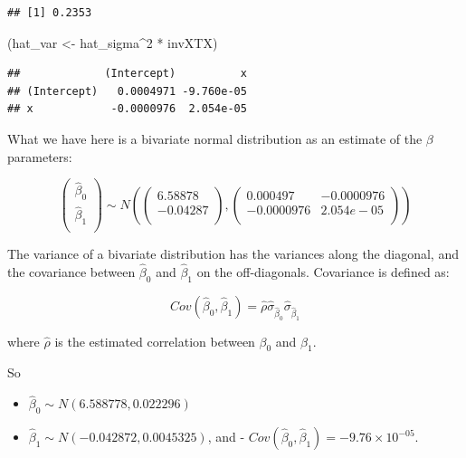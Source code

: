 \documentclass[
  12pt,
]{krantz}
\newenvironment{Shaded}{\begin{snugshade}}{\end{snugshade}}
\newcommand{\DecValTok}[1]{\textcolor[rgb]{0.00,0.00,0.81}{#1}}
\newcommand{\NormalTok}[1]{#1}
\newcommand{\OtherTok}[1]{\textcolor[rgb]{0.56,0.35,0.01}{#1}}
\newcommand{\SpecialCharTok}[1]{\textcolor[rgb]{0.00,0.00,0.00}{#1}}
\providecommand{\tightlist}{%
  \setlength{\itemsep}{0pt}\setlength{\parskip}{0pt}}
\theoremstyle{definition}
\theoremstyle{definition}
\theoremstyle{definition}
\theoremstyle{definition}
\theoremstyle{remark}
\begin{document}
\begin{verbatim}
## [1] 0.2353
\end{verbatim}

\begin{Shaded}
\begin{Highlighting}[]
\NormalTok{(hat\_var }\OtherTok{\textless{}{-}}\NormalTok{ hat\_sigma}\SpecialCharTok{\^{}}\DecValTok{2} \SpecialCharTok{*}\NormalTok{ invXTX)}
\end{Highlighting}
\end{Shaded}

\begin{verbatim}
##             (Intercept)          x
## (Intercept)   0.0004971 -9.760e-05
## x            -0.0000976  2.054e-05
\end{verbatim}

What we have here is a bivariate normal distribution as an estimate of the \(\beta\) parameters:

\begin{equation}
\begin{pmatrix}
\hat\beta_0\\
\hat\beta_1\\
\end{pmatrix}
\sim 
N(\begin{pmatrix}
6.58878\\
-0.04287\\
\end{pmatrix},
\begin{pmatrix}
 0.000497 & -0.0000976\\
-0.0000976 & 2.054e-05\\
\end{pmatrix})
\end{equation}

The variance of a bivariate distribution has the variances along the diagonal, and the covariance between \(\hat\beta_0\) and
\(\hat\beta_1\) on the off-diagonals. Covariance is defined as:

\begin{equation}
Cov(\hat\beta_0,\hat\beta_1)=\hat\rho \hat\sigma_{\hat\beta_0}\hat\sigma_{\hat\beta_1}
\end{equation}

where \(\hat\rho\) is the estimated correlation between \(\beta_0\) and \(\beta_1\).

So

\begin{itemize}
\tightlist
\item
  \(\hat\beta_0 \sim N(6.588778,0.022296)\)
\item
  \(\hat\beta_1 \sim N(-0.042872,0.0045325)\), and - \(Cov(\hat\beta_0,\hat\beta_1)=-9.76\times 10^{-05}\).
\end{itemize}
\end{document}
